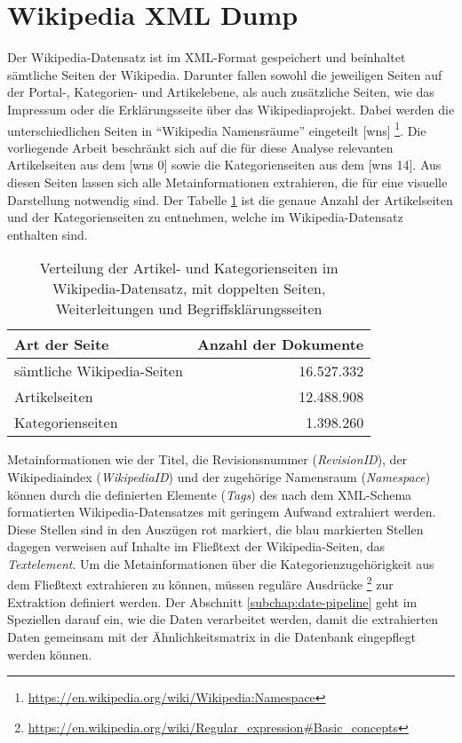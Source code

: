\section{Wikipedia XML Dump} \label{subchap:wikidump}
Der Wikipedia-Datensatz ist im XML-Format gespeichert und beinhaltet sämtliche Seiten der Wikipedia. 
Darunter fallen sowohl die jeweiligen Seiten auf der Portal-, Kategorien- und Artikelebene, als auch zusätzliche Seiten, wie das Impressum oder die Erklärungsseite über das Wikipediaprojekt.
Dabei werden die unterschiedlichen Seiten in "`Wikipedia Namensräume"' eingeteilt [wns] \footnote{\url{https://en.wikipedia.org/wiki/Wikipedia:Namespace}}.
Die vorliegende Arbeit beschränkt sich auf die für diese Analyse relevanten Artikelseiten aus dem [wns 0] sowie die Kategorienseiten aus dem [wns 14].
Aus diesen Seiten lassen sich alle Metainformationen extrahieren, die für eine visuelle Darstellung notwendig sind.
Der Tabelle \ref{tab:xml-overview} ist die genaue Anzahl der Artikelseiten und der Kategorienseiten zu entnehmen, welche im Wikipedia-Datensatz enthalten sind.

\begin{table}
\centering
\begin{tabular}{l r}
  \hline
  Art der Seite & Anzahl der Dokumente \\
  \hline
  sämtliche Wikipedia-Seiten & 16.527.332 \\
  Artikelseiten & 12.488.908 \\
  Kategorienseiten & 1.398.260 \\
  \hline
\end{tabular}
\caption{Verteilung der Artikel- und Kategorienseiten im Wikipedia-Datensatz, mit doppelten Seiten, Weiterleitungen und Begriffsklärungsseiten}
\label{tab:xml-overview}
\end{table}

Metainformationen wie der Titel, die Revisionsnummer (\emph{RevisionID}), der Wikipediaindex (\emph{WikipediaID}) und der zugehörige Namensraum (\emph{Namespace}) können durch die definierten Elemente (\emph{Tags}) des nach dem XML-Schema formatierten Wikipedia-Datensatzes mit geringem Aufwand extrahiert werden.
Diese Stellen sind in den Auszügen rot markiert, die blau markierten Stellen dagegen verweisen auf Inhalte im Fließtext der Wikipedia-Seiten, das \emph{Textelement}.
Um die Metainformationen über die Kategorienzugehörigkeit aus dem Fließtext extrahieren zu können, müssen reguläre Ausdrücke \footnote{\url{https://en.wikipedia.org/wiki/Regular\_expression\#Basic\_concepts}} zur Extraktion definiert werden.
Der Abschnitt \ref{subchap:date-pipeline} geht im Speziellen darauf ein, wie die Daten verarbeitet werden, damit die extrahierten Daten gemeinsam mit der Ähnlichkeitsmatrix in die Datenbank eingepflegt werden können.

